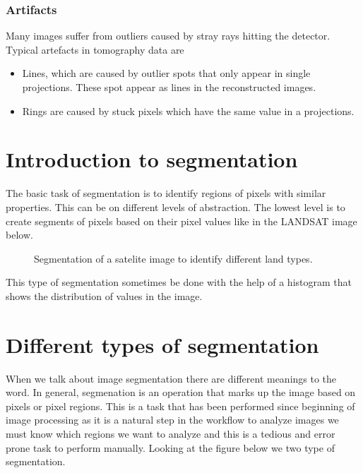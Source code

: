 \documentclass[letterpaper,10pt,english]{sphinxmanual}
\begin{document}
\subsubsection{Artifacts}
\label{\detokenize{ML4NeutronImageSegmentation:artifacts}}
Many images suffer from outliers caused by stray rays hitting the detector. Typical artefacts in tomography data are
\begin{itemize}
\item {} 
Lines, which are caused by outlier spots that only appear in single projections. These spot appear as lines in the reconstructed images.

\item {} 
Rings are caused by stuck pixels which have the same value in a projections.

\end{itemize}


\section{Introduction to segmentation}
\label{\detokenize{ML4NeutronImageSegmentation:introduction-to-segmentation}}
The basic task of segmentation is to identify regions of pixels with similar properties. This can be on different levels of abstraction. The lowest level is to create segments of pixels based on their pixel values like in the LANDSAT image below.

\begin{figure}[htbp]
\centering
\capstart

\noindent{}
\caption{Segmentation of a satelite image to identify different land types.}\label{\detokenize{ML4NeutronImageSegmentation:id8}}\end{figure}

This type of segmentation sometimes be done with the help of a histogram that shows the distribution of values in the image.




\section{Different types of segmentation}
\label{\detokenize{ML4NeutronImageSegmentation:different-types-of-segmentation}}
When we talk about image segmentation there are different meanings to the word. In general, segmenation is an operation that marks up the image based on pixels or pixel regions. This is a task that has been performed since beginning of image processing as it is a natural step in the workflow to analyze images \sphinxhyphen{} we must know which regions we want to analyze and this is a tedious and error prone task to perform manually. Looking at the figure below we two type of segmentation.
\end{document}
